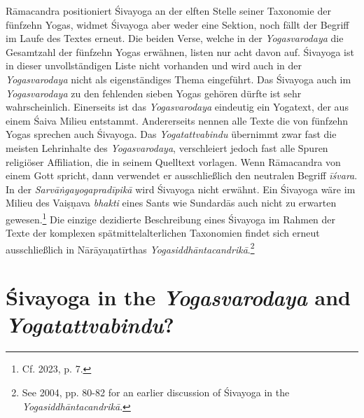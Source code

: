 Rāmacandra positioniert Śivayoga an der elften Stelle seiner Taxonomie der fünfzehn Yogas, widmet Śivayoga aber weder eine Sektion, noch fällt der Begriff im Laufe des Textes erneut. Die beiden Verse, welche in der \textit{Yogasvarodaya} die Gesamtzahl der fünfzehn Yogas erwähnen, listen nur acht davon auf. Śivayoga ist in dieser unvollständigen Liste nicht vorhanden und wird auch in der \textit{Yogasvarodaya} nicht als eigenständiges Thema eingeführt. Das Śivayoga auch im \textit{Yogasvarodaya} zu den fehlenden sieben Yogas gehören dürfte ist sehr wahrscheinlich. Einerseits ist das \textit{Yogasvarodaya} eindeutig ein Yogatext, der aus einem Śaiva Milieu entstammt. Andererseits nennen alle Texte die von fünfzehn Yogas sprechen auch Śivayoga. Das \textit{Yogatattvabindu} übernimmt zwar fast die meisten Lehrinhalte des \textit{Yogasvarodaya}, verschleiert jedoch fast alle Spuren religiöser Affiliation, die in seinem Quelltext vorlagen. Wenn Rāmacandra von einem Gott spricht, dann verwendet er ausschließlich den neutralen Begriff \textit{īśvara}. In der \textit{Sarvāṅgayogapradīpikā} wird Śivayoga nicht erwähnt. Ein Śivayoga wäre im Milieu des Vaiṣṇava \textit{bhakti} eines Sants wie Sundardās auch nicht zu erwarten gewesen.\footnote{Cf. \citeauthor{horstmann2023shrine} 2023, p. 7.} Die einzige dezidierte Beschreibung eines Śivayoga im Rahmen der Texte der komplexen spätmittelalterlichen Taxonomien findet sich erneut ausschließlich in Nārāyaṇatīrthas \textit{Yogasiddhāntacandrikā}.\footnote{See \citeauthor{penna2004} 2004, pp. 80-82 for an earlier discussion of Śivayoga in the \textit{Yogasiddhāntacandrikā}.}

\section{Śivayoga in the \textit{Yogasvarodaya} and \textit{Yogatattvabindu}?}

